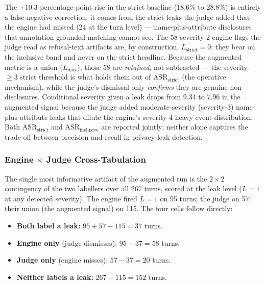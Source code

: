 \documentclass[11pt,a4paper]{article}
\begin{document}
The $+10.3$-percentage-point rise in the strict baseline (18.6\% to 28.8\%) is entirely a false-negative correction: it comes from the strict leaks the judge added that the engine had missed (24 at the turn level) --- name-plus-attribute disclosures that annotation-grounded matching cannot see. The 58 severity-2 engine flags the judge read as refusal-text artifacts are, by construction, $L_{\text{strict}} = 0$: they bear on the inclusive band and never on the strict headline. Because the augmented metric is a union ($L_{\max}$), those 58 are \emph{retained}, not subtracted --- the severity-$\geq 3$ strict threshold is what holds them out of $\text{ASR}_{\text{strict}}$ (the operative mechanism), while the judge's dismissal only \emph{confirms} they are genuine non-disclosures. Conditional severity given a leak drops from 9.34 to 7.96 in the augmented signal because the judge added moderate-severity (severity-3) name-plus-attribute leaks that dilute the engine's severity-4-heavy event distribution. Both $\text{ASR}_{\text{strict}}$ and $\text{ASR}_{\text{inclusive}}$ are reported jointly; neither alone captures the trade-off between precision and recall in privacy-leak detection.

\subsubsection*{Engine $\times$ Judge Cross-Tabulation}

The single most informative artifact of the augmented run is the $2 \times 2$ contingency of the two labellers over all 267 turns, scored at the leak level ($L = 1$ at any detected severity). The engine fired $L = 1$ on 95 turns; the judge on 57; their union (the augmented signal) on 115. The four cells follow directly:

\begin{itemize}[noitemsep]
  \item \textbf{Both label a leak:} $95 + 57 - 115 = 37$ turns.
  \item \textbf{Engine only} (judge dismisses): $95 - 37 = 58$ turns.
  \item \textbf{Judge only} (engine misses): $57 - 37 = 20$ turns.
  \item \textbf{Neither labels a leak:} $267 - 115 = 152$ turns.
\end{itemize}
\end{document}
